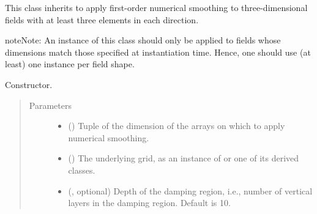 \documentclass[letterpaper,10pt,english]{sphinxmanual}
\begin{document}
\begin{fulllineitems}
\label{\detokenize{api:dycore.horizontal_smoothing.HorizontalSmoothingFirstOrderXYZ}}
This class inherits {\hyperref[\detokenize{api:dycore.horizontal_smoothing.HorizontalSmoothing}]{}} to apply first-order numerical smoothing to
three-dimensional fields with at least three elements in each direction.

\begin{sphinxadmonition}{note}{Note:}
An instance of this class should only be applied to fields whose dimensions match those specified at instantiation time.
Hence, one should use (at least) one instance per field shape.
\end{sphinxadmonition}

\begin{fulllineitems}
\label{\detokenize{api:dycore.horizontal_smoothing.HorizontalSmoothingFirstOrderXYZ.__init__}}
Constructor.
\begin{quote}\begin{description}
\item[{Parameters}] \leavevmode\begin{itemize}
\item {} 
 () \textendash{} Tuple of the dimension of the arrays on which to apply numerical smoothing.

\item {} 
 () \textendash{} The underlying grid, as an instance of {\hyperref[\detokenize{api:grids.grid_xyz.GridXYZ}]{}} or one of its derived classes.

\item {} 
 (, optional) \textendash{} Depth of the damping region, i.e., number of vertical layers in the damping region. Default is 10.


\end{itemize}
\end{description}
\end{quote}
\end{fulllineitems}
\end{fulllineitems}
\end{document}
